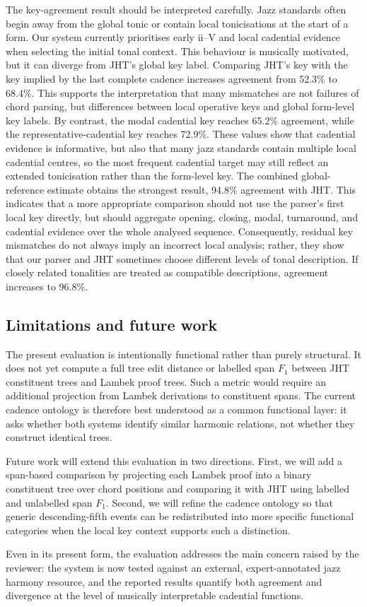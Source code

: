 The key-agreement result should be interpreted carefully. Jazz standards often
begin away from the global tonic or contain local tonicisations at the start of
a form. Our system currently prioritises early ii--V and local cadential
evidence when selecting the initial tonal context. This behaviour is musically
motivated, but it can diverge from JHT's global key label. Comparing JHT's key
with the key implied by the last complete cadence increases agreement from
52.3\% to 68.4\%. This supports the interpretation that many mismatches are not
failures of chord parsing, but differences between local operative keys and
global form-level key labels. By contrast, the modal cadential key reaches
65.2\% agreement, while the representative-cadential key reaches 72.9\%. These
values show that cadential evidence is informative, but also that many jazz
standards contain multiple local cadential centres, so the most frequent
cadential target may still reflect an extended tonicisation rather than the
form-level key. The combined global-reference estimate obtains the strongest
result, 94.8\% agreement with JHT. This indicates that a more appropriate
comparison should not use the parser's first local key directly, but should
aggregate opening, closing, modal, turnaround, and cadential evidence over the
whole analysed sequence. Consequently, residual key mismatches do not always
imply an incorrect local analysis; rather, they show that our parser and JHT
sometimes choose different levels of tonal description. If closely related
tonalities are treated as compatible descriptions, agreement increases to
96.8\%.

\subsection{Limitations and future work}

The present evaluation is intentionally functional rather than purely
structural. It does not yet compute a full tree edit distance or labelled span
$F_1$ between JHT constituent trees and Lambek proof trees. Such a metric would
require an additional projection from Lambek derivations to constituent spans.
The current cadence ontology is therefore best understood as a common
functional layer: it asks whether both systems identify similar harmonic
relations, not whether they construct identical trees.

Future work will extend this evaluation in two directions. First, we will add a
span-based comparison by projecting each Lambek proof into a binary constituent
tree over chord positions and comparing it with JHT using labelled and
unlabelled span $F_1$. Second, we will refine the cadence ontology so that
generic descending-fifth events can be redistributed into more specific
functional categories when the local key context supports such a distinction.

Even in its present form, the evaluation addresses the main concern raised by
the reviewer: the system is now tested against an external, expert-annotated
jazz harmony resource, and the reported results quantify both agreement and
divergence at the level of musically interpretable cadential functions.
